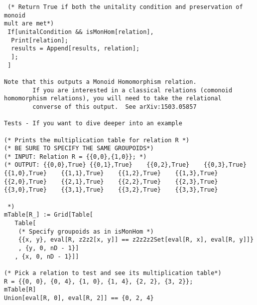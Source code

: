 \begin{lstlisting}
 (* Return True if both the unitality condition and preservation of monoid
mult are met*)
 If[unitalCondition && isMonHom[relation],
  Print[relation];
  results = Append[results, relation];
  ];
 ]

Note that this outputs a Monoid Homomorphism relation.
        If you are interested in a classical relations (comonoid homomorphism relations), you will need to take the relational 
        converse of this output.  See arXiv:1503.05857

Tests - If you want to dive deeper into an example

(* Prints the multiplication table for relation R *)
(* BE SURE TO SPECIFY THE SAME GROUPOIDS*)
(* INPUT: Relation R = {{0,0},{1,0}}; *)
(* OUTPUT: {{0,0},True} {{0,1},True}    {{0,2},True}    {{0,3},True}
{{1,0},True}    {{1,1},True}    {{1,2},True}    {{1,3},True}
{{2,0},True}    {{2,1},True}    {{2,2},True}    {{2,3},True}
{{3,0},True}    {{3,1},True}    {{3,2},True}    {{3,3},True}

 *)
mTable[R_] := Grid[Table[
   Table[
    (* Specify groupoids as in isMonHom *)
    {{x, y}, eval[R, z2z2[x, y]] == z2z2z2Set[eval[R, x], eval[R, y]]}
    , {y, 0, nD - 1}]
   , {x, 0, nD - 1}]]

(* Pick a relation to test and see its multiplication table*)
R = {{0, 0}, {0, 4}, {1, 0}, {1, 4}, {2, 2}, {3, 2}};
mTable[R]
Union[eval[R, 0], eval[R, 2]] == {0, 2, 4}

\end{lstlisting}
